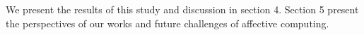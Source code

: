\documentclass[10pt, a4paper]{article} %
\begin{document}
	We present the results of this study and discussion in section 4. Section 5 present the perspectives of our works and future challenges of affective computing. 
%	
%	
%			
%			
\end{document}
